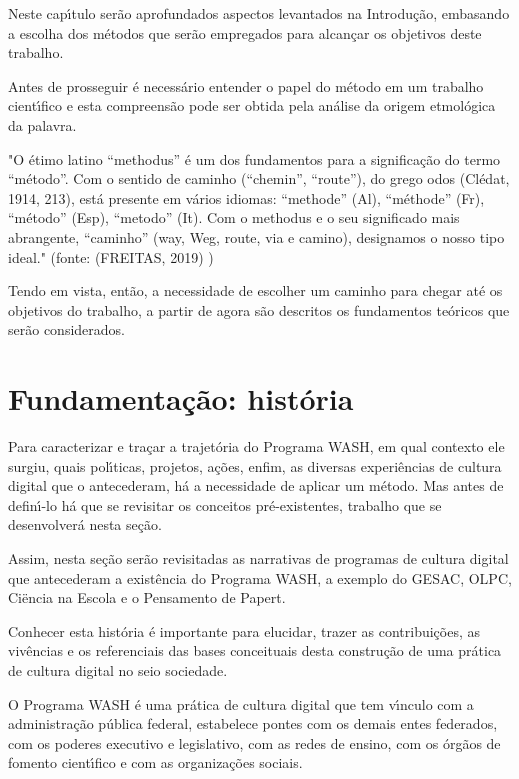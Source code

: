 \documentclass[
12pt,		%
openright,	%
twoside,  %
a4paper,			%
chapter=TITLE,		%
english,			%
french,				%
spanish,			%
brazil				%
]{USPSC-classe/USPSC}
\begin{document}
Neste cap\'{\i}tulo ser\~ao aprofundados aspectos levantados na Introdu\c{c}\~ao, embasando a escolha dos m\'etodos que ser\~ao empregados para alcan\c{c}ar os objetivos deste trabalho.


Antes de prosseguir \'e necess\'ario entender o papel do m\'etodo em um trabalho cient\'{\i}fico e esta compreens\~ao pode ser obtida pela an\'alise da origem etmol\'ogica da palavra.


"O \'etimo latino “methodus” \'e um dos fundamentos para a significa\c{c}\~ao do termo “m\'etodo”. Com o sentido de caminho (“chemin”, “route”), do grego odos (Cl\'edat, 1914, 213), est\'a presente em v\'arios idiomas: “methode” (Al), “m\'ethode” (Fr), “m\'etodo” (Esp), “metodo” (It). Com o methodus e o seu significado mais abrangente, “caminho” (way, Weg, route, via e camino), designamos o nosso tipo ideal." (fonte: (FREITAS, 2019) )



Tendo em vista, ent\~ao, a necessidade de escolher um caminho para chegar at\'e os objetivos do trabalho, a partir de agora s\~ao descritos os fundamentos te\'oricos que ser\~ao considerados.





\section[Fundamenta\c{c}\~ao: hist\'oria]{Fundamenta\c{c}\~ao: hist\'oria}\label{Fundamenta\c{c}\~ao: hist\'oria}
Para caracterizar e tra\c{c}ar a trajet\'oria do Programa WASH, em qual contexto ele surgiu, quais pol\'{\i}ticas, projetos, a\c{c}\~oes, enfim, as diversas experi\^encias de cultura digital que o antecederam, h\'a a necessidade de aplicar um m\'etodo. Mas antes de defin\'{\i}-lo h\'a que se revisitar os conceitos pr\'e-existentes, trabalho que se desenvolver\'a nesta se\c{c}\~ao.


Assim, nesta se\c{c}\~ao ser\~ao revisitadas as narrativas de programas de cultura digital que antecederam a exist\^encia do Programa WASH, a exemplo do GESAC, OLPC, Ciëncia na Escola e o Pensamento de Papert.


Conhecer esta hist\'oria \'e importante para elucidar, trazer as contribui\c{c}\~oes, as viv\^encias e os referenciais das bases conceituais desta constru\c{c}\~ao de uma pr\'atica de cultura digital no seio sociedade.


O Programa WASH \'e uma pr\'atica de cultura digital que tem v\'{\i}nculo com a administra\c{c}\~ao p\'ublica federal, estabelece pontes com os demais entes federados, com os poderes executivo e legislativo, com as redes de ensino, com os \'org\~aos de fomento cient\'{\i}fico e com as organiza\c{c}\~oes sociais.
\end{document}

